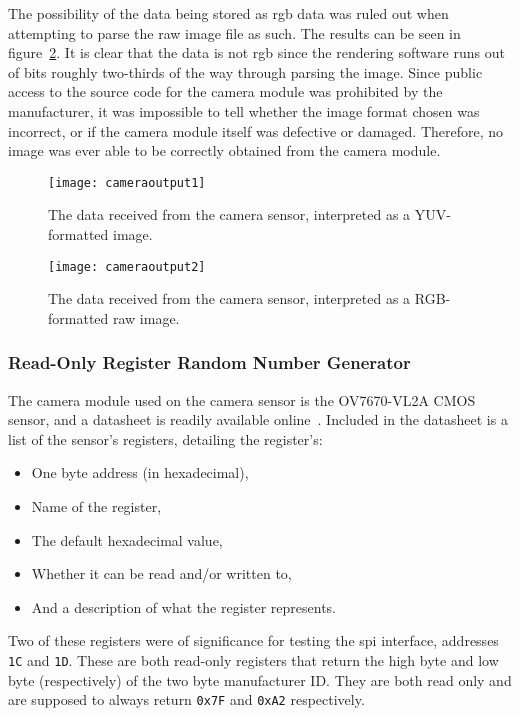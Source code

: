 The possibility of the data being stored as \acrfull{rgb} data was ruled out
when attempting to parse the raw image file as such. The results can be seen
in figure~\ref{fig:rgbimage}. It is clear that the data is not \acrshort{rgb}
since the rendering software runs out of bits roughly two-thirds of the way
through parsing the image. Since public access to the source code for the
camera module was prohibited by the manufacturer, it was impossible to tell
whether the image format chosen was incorrect, or if the camera module itself
was defective or damaged. Therefore, no image was ever able to be correctly
obtained from the camera module.

\begin{figure}[h]
  \centering
  \texttt{[image: cameraoutput1]}
  \caption{The data received from the camera sensor, interpreted as a
  YUV-formatted image.}
  \label{fig:yuvimage}
\end{figure}

\begin{figure}[h]
  \centering
  \texttt{[image: cameraoutput2]}
  \caption{The data received from the camera sensor, interpreted as a
  RGB-formatted raw image.}
  \label{fig:rgbimage}
\end{figure}

\subsubsection{Read-Only Register Random Number Generator}
The camera module used on the camera sensor is the OV7670-VL2A CMOS sensor,
and a datasheet is readily available online~\cite{omnivisiondatasheet}.
Included in the datasheet is a list of the sensor's registers, detailing the
register's:

\begin{itemize}
  \item One byte address (in hexadecimal),
  \item Name of the register,
  \item The default hexadecimal value,
  \item Whether it can be read and/or written to,
  \item And a description of what the register represents.
\end{itemize}

Two of these registers were of significance for testing the \acrshort{spi}
interface, addresses \texttt{1C} and \texttt{1D}. These are both read-only
registers that return the high byte and low byte (respectively) of the two
byte manufacturer ID. They are both read only and are supposed to always
return \texttt{0x7F} and \texttt{0xA2} respectively.

